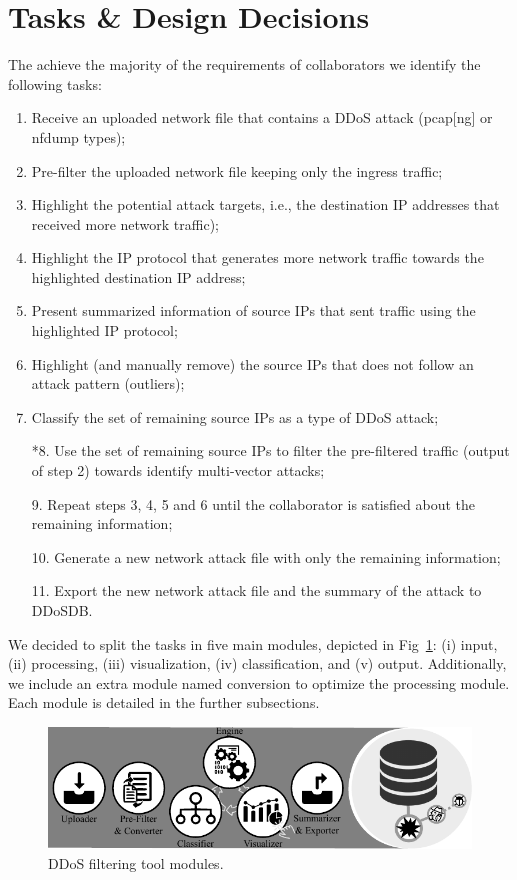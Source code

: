 \documentclass{llncs}
\begin{document}
\section{Tasks \& Design Decisions}

The achieve the majority of the requirements of collaborators we identify the following tasks:
\begin{enumerate}
	\item Receive an uploaded network file that contains a DDoS attack (pcap[ng] or nfdump types);	
	\item Pre-filter the uploaded network file keeping only the ingress traffic;
	\item Highlight the potential attack targets, i.e., the destination IP addresses that received more network traffic);
	\item Highlight the IP protocol that generates more network traffic towards the highlighted destination IP address;
	\item Present summarized information of source IPs that sent traffic using the highlighted IP protocol;
	\item Highlight (and manually remove) the source IPs that does not follow an attack pattern (outliers);
	\item Classify the set of remaining source IPs as a type of DDoS attack;
	\item[*8.] Use the set of remaining source IPs to filter the pre-filtered traffic (output of step 2) towards identify multi-vector attacks;  
	\item[9.] Repeat steps 3, 4, 5 and 6 until the collaborator is satisfied about the remaining information;
	\item[10.] Generate a new network attack file with only the remaining information;
	\item[11.] Export the new network attack file and the summary of the attack to DDoSDB.
\end{enumerate}

We decided to split the tasks in five main modules, depicted in Fig~\ref{fig:modules}: (i) \textsf{input}, (ii) \textsf{processing}, (iii) \textsf{visualization}, (iv) \textsf{classification}, and (v) \textsf{output}. Additionally, we include an extra module named \textsf{conversion} to optimize the \textsf{processing module}. Each module is detailed in the further subsections.

\begin{figure}[!ht] 
\centering 
\includegraphics[]{figs/framework.pdf}
\caption{DDoS filtering tool modules.} 
\label{fig:modules} 
\end{figure}
\end{document}
